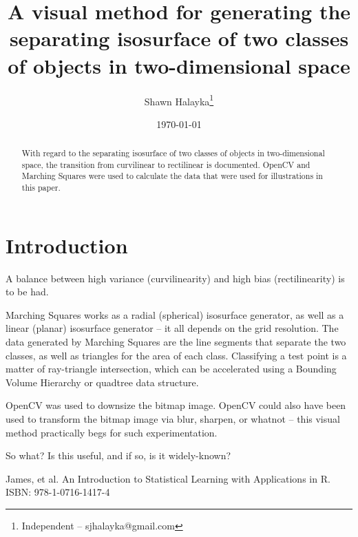 \documentclass[12pt]{article}
\title{A visual method for generating the separating isosurface of two classes of objects in two-dimensional space}
\author{
Shawn Halayka\footnote{Independent -- sjhalayka@gmail.com}
}
\date{\today\;\currenttime}
\begin{document}
\maketitle

\begin{abstract}
With regard to the separating isosurface of two classes of objects in two-dimensional space, the transition from curvilinear to rectilinear is documented.
OpenCV and Marching Squares were used to calculate the data that were used for illustrations in this paper.
\end{abstract}




\section{Introduction}

A balance between high variance (curvilinearity) and high bias (rectilinearity) is to be had.

Marching Squares works as a radial (spherical) isosurface generator, as well as a linear (planar) isosurface generator -- it all depends on the grid resolution.
The data generated by Marching Squares are the line segments that separate the two classes, as well as triangles for the area of each class.
Classifying a test point is a matter of ray-triangle intersection, which can be accelerated using a Bounding Volume Hierarchy or quadtree data structure.

OpenCV was used to downsize the bitmap image.
OpenCV could also have been used to transform the bitmap image via blur, sharpen, or whatnot -- this visual method practically begs for such experimentation.

So what? Is this useful, and if so, is it widely-known?



\begin{thebibliography}{9}

 James, et al. An Introduction to Statistical Learning with Applications in R. ISBN: 978-1-0716-1417-4

\end{thebibliography}
\end{document}
